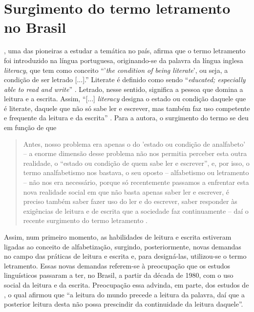 \documentclass{textolivre}
\begin{document}
\section{Surgimento do termo letramento no Brasil}\label{sec-surgimento}
\textcite[p. 35]{soares2004}, uma das pioneiras a estudar
a temática no país, afirma que o termo letramento foi introduzido na língua
portuguesa, originando-se da palavra da língua inglesa \textit{literacy}, que tem como
conceito “’\textit{the condition of being literate}’, ou seja, a condição de ser letrado
[...].” Literate é definido como sendo “\textit{educated; especially able to read and
write}” \cite[p. 35]{soares2004}. Letrado, nesse sentido, significa a pessoa que
domina a leitura e a escrita. Assim, “[...] \textit{literacy} designa o estado ou
condição daquele que é literate, daquele que não só sabe ler e escrever, mas
também faz uso competente e frequente da leitura e da escrita” \cite[p. 36]{soares2004}.
Para a autora, o surgimento do termo se deu em função de que
\begin{quote}
Antes, nosso problema era apenas o do 'estado ou condição de analfabeto' – a
enorme dimensão desse problema não nos permitia perceber esta outra realidade,
o “estado ou condição de quem sabe ler e escrever”, e, por isso, o termo
analfabetismo nos bastava, o seu oposto – alfabetismo ou letramento – não nos
era necessário, porque só recentemente passamos a enfrentar esta nova realidade
social em que não basta apenas saber ler e escrever, é preciso também saber
fazer uso do ler e do escrever, saber responder às exigências de leitura e de
escrita que a sociedade faz continuamente – daí o recente surgimento do termo
letramento \cite[p. 20]{soares2004}.
\end{quote}

Assim, num primeiro momento, as habilidades de leitura e escrita estiveram
ligadas ao conceito de alfabetização, surgindo, posteriormente, novas demandas
no campo das práticas de leitura e escrita e, para designá-las, utilizou-se o
termo letramento. Essas novas demandas referem-se à preocupação que os estudos
linguísticos passaram a ter, no Brasil, a partir da década de 1980, com o uso
social da leitura e da escrita. Preocupação essa advinda, em parte, dos estudos
de \textcite[p. 9]{freire1989}, o qual afirmou que “a leitura do mundo precede a
leitura da palavra, daí que a posterior leitura desta não possa prescindir da
continuidade da leitura daquele”.
\end{document}
